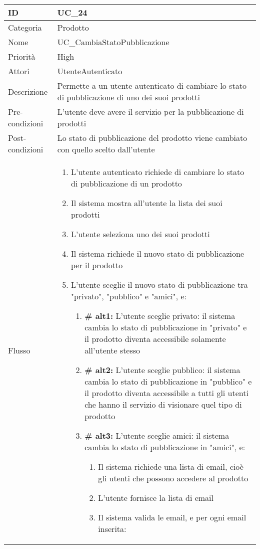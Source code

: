\begin{center}
\begin{tabular}{ |p{2cm}|p{13cm}|  }
\hline
ID & UC\_24\\\hline
Categoria & Prodotto \\\hline
Nome & UC\_CambiaStatoPubblicazione \\\hline
Priorità & High \\\hline
Attori &  UtenteAutenticato \\\hline
Descrizione & Permette a un utente autenticato di cambiare lo stato di pubblicazione di uno dei suoi prodotti\\\hline
Pre-condizioni &  L'utente deve avere il servizio per la pubblicazione di prodotti\\\hline
Post-condizioni &  Lo stato di pubblicazione del prodotto viene cambiato con quello scelto dall'utente\\\hline
Flusso &  	\begin{enumerate}
			\item L'utente autenticato richiede di cambiare lo stato di pubblicazione di un prodotto
			\item Il sistema mostra all'utente la lista dei suoi prodotti
			\item L'utente seleziona uno dei suoi prodotti
			\item Il sistema richiede il nuovo stato di pubblicazione per il prodotto
			\item L'utente sceglie il nuovo stato di pubblicazione tra "privato", "pubblico" e "amici", e:
				\begin{enumerate}[  ]
					\item \textbf{\# alt1:} L'utente sceglie privato: il sistema cambia lo stato di pubblicazione in "privato" e il prodotto diventa accessibile solamente all'utente stesso
					\item \textbf{\# alt2:} L'utente sceglie pubblico: il sistema cambia lo stato di pubblicazione in "pubblico" e il prodotto diventa accessibile a tutti gli utenti che hanno il servizio di visionare quel tipo di prodotto
					\item \textbf{\# alt3:} L'utente sceglie amici: il sistema cambia lo stato di pubblicazione in "amici", e:
					\begin{enumerate}[label*=\arabic*.]
						\item Il sistema richiede una lista di email, cioè gli utenti che possono accedere al prodotto
						\item L'utente fornisce la lista di email
						\item Il sistema valida le email, e per ogni email inserita:

\end{enumerate}
\end{enumerate}
\end{enumerate}
\end{tabular}
\end{center}
